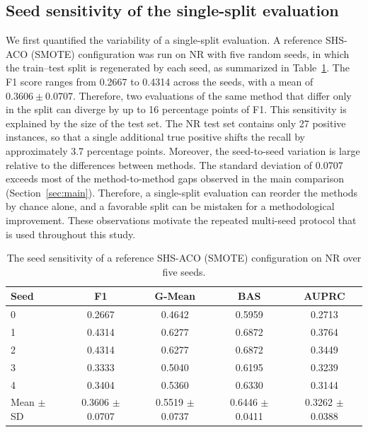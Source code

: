 \documentclass[pdflatex,sn-basic]{sn-jnl}
\begin{document}
\subsection{Seed sensitivity of the single-split evaluation}
\label{sec:seed}
We first quantified the variability of a single-split evaluation. A
reference SHS-ACO (SMOTE) configuration was run on NR with five random
seeds, in which the train--test split is regenerated by each seed, as
summarized in Table~\ref{tab:repro}. The F1 score ranges from 0.2667 to
0.4314 across the seeds, with a mean of $0.3606 \pm 0.0707$. Therefore,
two evaluations of the same method that differ only in the split can
diverge by up to 16 percentage points of F1. This sensitivity is explained
by the size of the test set. The NR test set contains only 27 positive
instances, so that a single additional true positive shifts the recall
by approximately 3.7 percentage points. Moreover, the seed-to-seed
variation is large relative to the differences between methods. The
standard deviation of 0.0707 exceeds most of the method-to-method gaps
observed in the main comparison (Section~\ref{sec:main}). Therefore, a
single-split evaluation can reorder the methods by chance alone, and a
favorable split can be mistaken for a methodological improvement. These
observations motivate the repeated multi-seed protocol that is used
throughout this study.

\begin{table}[htbp]
\centering
\caption{The seed sensitivity of a reference SHS-ACO (SMOTE)
configuration on NR over five seeds.}
\label{tab:repro}
\begin{tabular}{lcccc}
\toprule
Seed & F1 & G-Mean & BAS & AUPRC \\
\midrule
0 & 0.2667 & 0.4642 & 0.5959 & 0.2713 \\
1 & 0.4314 & 0.6277 & 0.6872 & 0.3764 \\
2 & 0.4314 & 0.6277 & 0.6872 & 0.3449 \\
3 & 0.3333 & 0.5040 & 0.6195 & 0.3239 \\
4 & 0.3404 & 0.5360 & 0.6330 & 0.3144 \\
\midrule
Mean $\pm$ SD & 0.3606 $\pm$ 0.0707 & 0.5519 $\pm$ 0.0737 & 0.6446 $\pm$ 0.0411 & 0.3262 $\pm$ 0.0388 \\
\bottomrule
\end{tabular}
\end{table}
\end{document}
